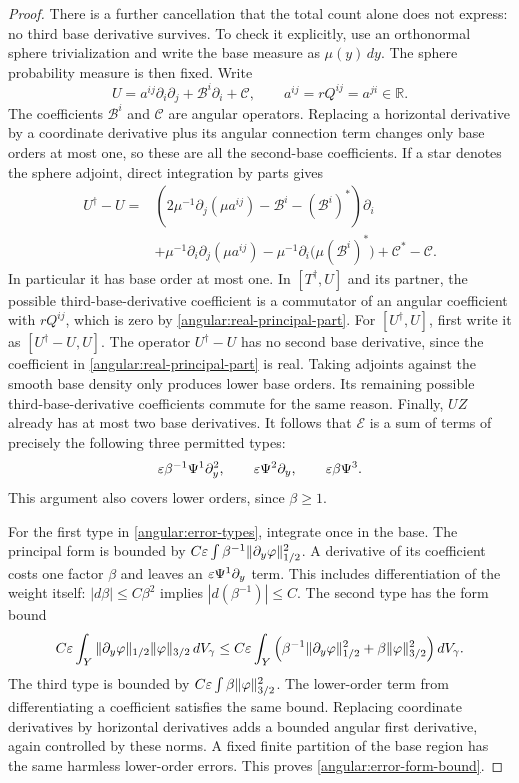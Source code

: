 \begin{proof}
There is a further cancellation that the total count alone does not
express: no third base derivative survives.  To check it explicitly,
use an orthonormal sphere trivialization and write the base measure as
$\mu(y)\,dy$.  The sphere probability measure is then fixed.  Write
\[
 U=a^{ij}\partial_i\partial_j+\mathcal B^i\partial_i+\mathcal C,
 \qquad a^{ij}=rQ^{ij}=a^{ji}\in\mathbb R.
\]
The coefficients $\mathcal B^i$ and $\mathcal C$ are angular
operators.  Replacing a horizontal derivative by a coordinate derivative
plus its angular connection term changes only base orders at most one,
so these are all the second-base coefficients.  If a star denotes the
sphere adjoint, direct integration by parts gives
\begin{align*}
 U^\dagger-U
 ={}&\left(2\mu^{-1}\partial_j(\mu a^{ij})
                -\mathcal B^i-(\mathcal B^i)^*\right)\partial_i\\
 &+\mu^{-1}\partial_i\partial_j(\mu a^{ij})
       -\mu^{-1}\partial_i\bigl(\mu(\mathcal B^i)^*\bigr)
       +\mathcal C^*-\mathcal C.
\end{align*}
In particular it has base order at most one.
In $[T^\dagger,U]$ and
its partner, the possible third-base-derivative coefficient is a commutator of an angular coefficient
with $rQ^{ij}$, which is zero by
\eqref{angular:real-principal-part}.  For $[U^\dagger,U]$, first write
it as $[U^\dagger-U,U]$.  The operator $U^\dagger-U$ has no second base
derivative, since the coefficient in
\eqref{angular:real-principal-part} is real.  Taking adjoints against
the smooth base density only produces lower base orders.  Its remaining
possible third-base-derivative coefficients commute for the same reason.
Finally, $UZ$ already has at most two base derivatives.
It follows that $\mathcal E$ is a sum of terms of precisely the following
three permitted types:
\begin{equation}\label{angular:error-types}
 \varepsilon\beta^{-1}\Psi^1\partial_y^2,
 \qquad \varepsilon\Psi^2\partial_y,
 \qquad \varepsilon\beta\Psi^3.
\end{equation}
This argument also covers lower orders, since $\beta\ge1$.

For the first type in \eqref{angular:error-types}, integrate once in the
base.  The principal form is bounded by
$C\varepsilon\int\beta^{-1}\|\partial_y\varphi\|_{1/2}^2$.
A derivative of its coefficient costs one factor $\beta$ and leaves an
$\varepsilon\Psi^1\partial_y$ term.  This includes differentiation of the
weight itself: $|d\beta|\le C\beta^2$ implies
$|d(\beta^{-1})|\le C$.  The second type has the form bound
\[
 C\varepsilon\int_Y
     \|\partial_y\varphi\|_{1/2}\|\varphi\|_{3/2}\,dV_\gamma
 \le C\varepsilon\int_Y\left(
     \beta^{-1}\|\partial_y\varphi\|_{1/2}^2
                 +\beta\|\varphi\|_{3/2}^2\right)dV_\gamma.
\]
The third type is bounded by
$C\varepsilon\int\beta\|\varphi\|_{3/2}^2$.
The lower-order term from differentiating a coefficient satisfies the
same bound.  Replacing coordinate derivatives by horizontal derivatives
adds a bounded angular first derivative, again controlled by these norms.
A fixed finite partition of the base region has the same harmless
lower-order errors.  This proves \eqref{angular:error-form-bound}.


\end{proof}
